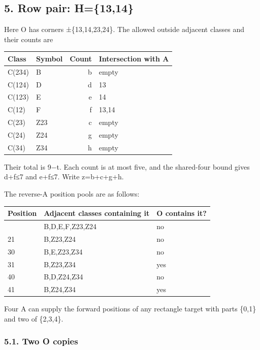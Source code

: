 \documentclass[
  10pt,
]{article}
\begin{document}
\hypertarget{row-pair-h1314}{%
\subsection*{5. Row pair: H=\{13,14\}}\label{row-pair-h1314}}

Here O has corners ±\{13,14,23,24\}. The allowed outside adjacent
classes and their counts are

\begin{longtable}[]{@{}llrl@{}}
\toprule\noalign{}
Class & Symbol & Count & Intersection with A \\
\midrule\noalign{}
\endhead
\bottomrule\noalign{}
\endlastfoot
C(234) & B & b & empty \\
C(124) & D & d & 13 \\
C(123) & E & e & 14 \\
C(12) & F & f & 13,14 \\
C(23) & Z23 & c & empty \\
C(24) & Z24 & g & empty \\
C(34) & Z34 & h & empty \\
\end{longtable}

Their total is 9−t. Each count is at most five, and the shared-four
bound gives d+f≤7 and e+f≤7. Write z=b+c+g+h.

The reverse-A position pools are as follows:

\begin{longtable}[]{@{}lll@{}}
\toprule\noalign{}
Position & Adjacent classes containing it & O contains it? \\
\midrule\noalign{}
\endhead
\bottomrule\noalign{}
\endlastfoot
20 & B,D,E,F,Z23,Z24 & no \\
21 & B,Z23,Z24 & no \\
30 & B,E,Z23,Z34 & no \\
31 & B,Z23,Z34 & yes \\
40 & B,D,Z24,Z34 & no \\
41 & B,Z24,Z34 & yes \\
\end{longtable}

Four A can supply the forward positions of any rectangle target with
parts \{0,1\} and two of \{2,3,4\}.

\hypertarget{two-o-copies}{%
\subsubsection*{5.1. Two O copies}\label{two-o-copies}}
\end{document}
